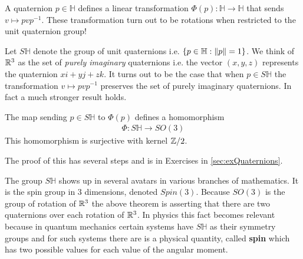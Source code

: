 A quaternion $p \in \mathbb{H}$ defines a linear transformation $\Phi(p):\mathbb{H} \rightarrow \mathbb{H}$ that sends $v \mapsto p v p^{-1}$. These transformation turn out to be rotations when restricted to the unit quaternion group!

Let $S\mathbb{H}$ denote the group of unit quaternions i.e. $\{ p \in \mathbb{H} : \lVert p \rVert = 1\}$. We think of $\mathbb{R}^3$ as the set of \emph{purely imaginary} quaternions i.e. the vector $(x,y,z)$ represents the quaternion $xi + yj + zk$. It turns out to be the case that when $p \in S \mathbb{H}$ the transformation $v \mapsto p v p^{-1}$ preserves the set of purely imaginary quaternions. In fact a much stronger result holds.


\begin{thm}
	\label{thm:quaternions}
	The map sending $p\in S\mathbb{H}$ to $\Phi(p)$ defines a homomorphism
	\begin{align}
		\Phi : S \mathbb{H} \rightarrow SO(3)
	\end{align}
	This homomorphism is surjective with kernel $\mathbb{Z}/2$.
\end{thm}
The proof of this has several steps and is in Exercises in  \ref{sec:exQuaternions}.

The group $S\mathbb{H}$ shows up in several avatars in various branches of mathematics. It is the spin group in 3 dimensions, denoted $Spin(3)$. Because $SO(3)$ is the group of rotation of $\mathbb{R}^3$ the above theorem is asserting that there are two quaternions over each rotation of $\mathbb{R}^3$. In physics this fact becomes relevant because in quantum mechanics certain systems have $S\mathbb{H}$ as their symmetry groups and for such systems there are is a physical quantity, called \textbf{spin} which has two possible values for each value of the angular moment.



